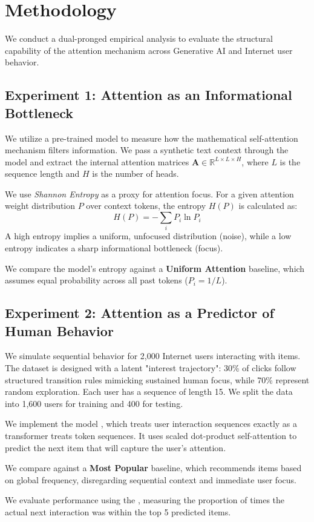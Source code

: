 \section{Methodology}
\label{sec:method}

We conduct a dual-pronged empirical analysis to evaluate the structural capability of the attention mechanism across Generative AI and Internet user behavior.

\subsection{Experiment 1: Attention as an Informational Bottleneck}
 We utilize a pre-trained \gpttwo model to measure how the mathematical self-attention mechanism filters information. We pass a synthetic text context through the model and extract the internal attention matrices $\mathbf{A} \in \mathbb{R}^{L \times L \times H}$, where $L$ is the sequence length and $H$ is the number of heads. 

 We use {\em Shannon Entropy} as a proxy for attention focus. For a given attention weight distribution $P$ over context tokens, the entropy $H(P)$ is calculated as:
\begin{equation}
    H(P) = -\sum_{i} P_i \ln P_i
\end{equation}
A high entropy implies a uniform, unfocused distribution (noise), while a low entropy indicates a sharp informational bottleneck (focus).

 We compare the model's entropy against a {\bf Uniform Attention} baseline, which assumes equal probability across all past tokens ($P_i = 1/L$).

\subsection{Experiment 2: Attention as a Predictor of Human Behavior}
 We simulate sequential behavior for 2,000 Internet users interacting with items. The dataset is designed with a latent "interest trajectory": 30\% of clicks follow structured transition rules mimicking sustained human focus, while 70\% represent random exploration. Each user has a sequence of length 15. We split the data into 1,600 users for training and 400 for testing.

 We implement the {\sasrec} model \cite{kang2018self}, which treats user interaction sequences exactly as a transformer treats token sequences. It uses scaled dot-product self-attention to predict the next item that will capture the user's attention.

 We compare against a {\bf Most Popular} baseline, which recommends items based on global frequency, disregarding sequential context and immediate user focus.

 We evaluate performance using the {\bf \hrfive}, measuring the proportion of times the actual next interaction was within the top 5 predicted items.
